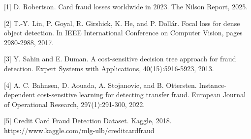 \documentclass[10pt,twocolumn,letterpaper]{article}
\begin{document}
{\small


}

[1] D. Robertson. Card fraud losses worldwide in 2023. The Nilson Report, 2025.

[2] T.-Y. Lin, P. Goyal, R. Girshick, K. He, and P. Dollár. Focal loss for dense object detection. In IEEE International Conference on Computer Vision, pages 2980-2988, 2017.

[3] Y. Sahin and E. Duman. A cost-sensitive decision tree approach for fraud detection. Expert Systems with Applications, 40(15):5916-5923, 2013.

[4] A. C. Bahnsen, D. Aouada, A. Stojanovic, and B. Ottersten. Instance-dependent cost-sensitive learning for detecting transfer fraud. European Journal of Operational Research, 297(1):291-300, 2022.

[5] Credit Card Fraud Detection Dataset. Kaggle, 2018. https://www.kaggle.com/mlg-ulb/creditcardfraud
\end{document}
